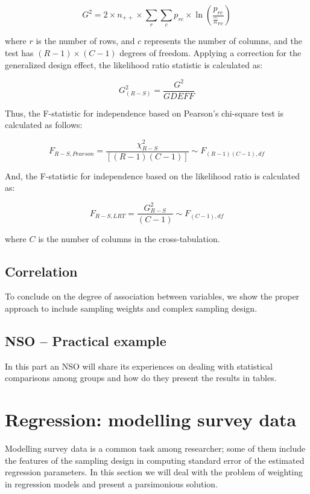 \documentclass[
  12pt,
]{book}
\begin{document}
\[
G^{2} = 2 \times n_{++} \times \sum_{r} \sum_{c} p_{rc} \times \ln \left( \frac{p_{rc}}{\hat{\pi}_{rc}} \right)
\]

where \(r\) is the number of rows, and \(c\) represents the number of columns, and the test has \((R-1) \times (C-1)\) degrees of freedom. Applying a correction for the generalized design effect, the likelihood ratio statistic is calculated as:

\[
G^2_{(R-S)} = \frac{G^2}{GDEFF}
\]

Thus, the F-statistic for independence based on Pearson's chi-square test is calculated as follows:

\[
F_{R-S,Pearson} = \frac{\chi^{2}_{R-S}}{\left[(R-1)(C-1)\right]} \sim F_{\left(R-1\right)\left(C-1\right),df}
\]

And, the F-statistic for independence based on the likelihood ratio is calculated as:

\[
F_{R-S,LRT} = \frac{G^{2}_{R-S}}{(C-1)} \sim F_{\left(C-1\right),df}
\]

where \(C\) is the number of columns in the cross-tabulation.

\section{Correlation}\label{correlation}

To conclude on the degree of association between variables, we show the proper approach to include sampling weights and complex sampling design.

\section{NSO -- Practical example}\label{nso-practical-example-1}

In this part an NSO will share its experiences on dealing with statistical comparisons among groups and how do they present the results in tables.

\chapter{Regression: modelling survey data}\label{regression-modelling-survey-data}

Modelling survey data is a common task among researcher; some of them include the features of the sampling design in computing standard error of the estimated regression parameters. In this section we will deal with the problem of weighting in regression models and present a parsimonious solution.
\end{document}

